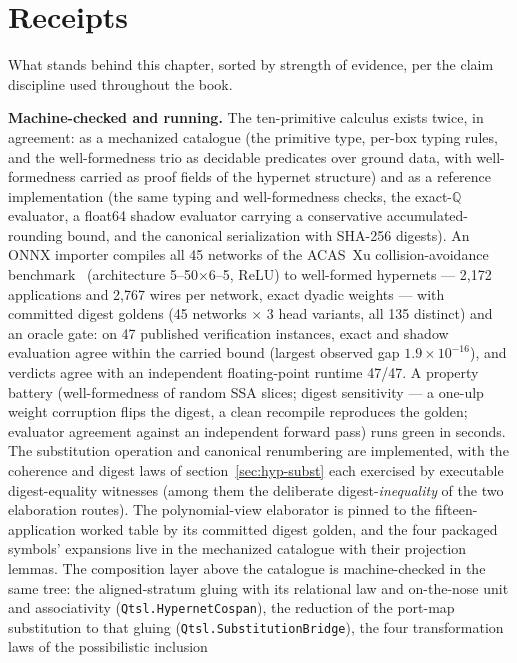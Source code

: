 \section{Receipts}
\label{sec:hyp-receipts}

What stands behind this chapter, sorted by strength of evidence, per
the claim discipline used throughout the book.

\textbf{Machine-checked and running.} The ten-primitive calculus
exists twice, in agreement: as a mechanized catalogue (the primitive
type, per-box typing rules, and the well-formedness trio as decidable
predicates over ground data, with well-formedness carried as proof
fields of the hypernet structure) and as a reference implementation
(the same typing and well-formedness checks, the exact-$\mathbb{Q}$
evaluator, a float64 shadow evaluator carrying a conservative
accumulated-rounding bound, and the canonical serialization with
SHA-256 digests). An ONNX importer compiles all 45 networks of the
ACAS~Xu collision-avoidance benchmark~\cite{katz2017reluplex}
(architecture 5--50$\times$6--5, ReLU) to well-formed hypernets --- 2{,}172
applications and 2{,}767 wires per network, exact dyadic weights ---
with committed digest goldens (45 networks $\times$ 3 head variants,
all 135 distinct) and an oracle gate: on 47 published verification
instances, exact and shadow evaluation agree within the carried
bound (largest observed gap $1.9 \times 10^{-16}$), and
verdicts agree with an independent floating-point runtime 47/47. A
property battery (well-formedness of random SSA slices; digest
sensitivity --- a one-ulp weight corruption flips the digest, a clean
recompile reproduces the golden; evaluator agreement against an
independent forward pass) runs green in seconds. The substitution
operation and canonical renumbering are implemented, with the
coherence and digest laws of section~\ref{sec:hyp-subst} each
exercised by executable digest-equality witnesses (among them the
deliberate digest-\emph{inequality} of the two elaboration
routes). The polynomial-view elaborator is pinned to the
fifteen-application worked table by its committed digest golden, and
the four packaged symbols' expansions live in the mechanized
catalogue with their projection lemmas. The composition layer above
the catalogue is machine-checked in the same tree: the
aligned-stratum gluing with its relational law and on-the-nose unit
and associativity (\texttt{Qtsl.HypernetCospan}), the reduction of
the port-map substitution to that gluing
(\texttt{Qtsl.SubstitutionBridge}), the four
transformation laws of the possibilistic inclusion
